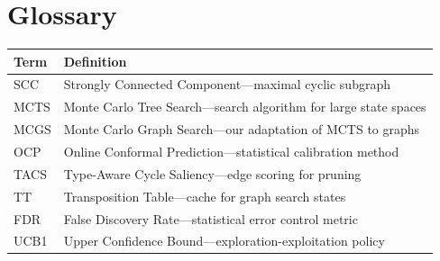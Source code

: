 \documentclass{article}
\begin{document}
\section{Glossary}

\begin{table}[h]
\centering
\small
\begin{tabular}{ll}
\toprule
\textbf{Term} & \textbf{Definition} \\
\midrule
SCC & Strongly Connected Component---maximal cyclic subgraph \\
MCTS & Monte Carlo Tree Search---search algorithm for large state spaces \\
MCGS & Monte Carlo Graph Search---our adaptation of MCTS to graphs \\
OCP & Online Conformal Prediction---statistical calibration method \\
TACS & Type-Aware Cycle Saliency---edge scoring for pruning \\
TT & Transposition Table---cache for graph search states \\
FDR & False Discovery Rate---statistical error control metric \\
UCB1 & Upper Confidence Bound---exploration-exploitation policy \\
\bottomrule
\end{tabular}
\end{table}

\end{document}
